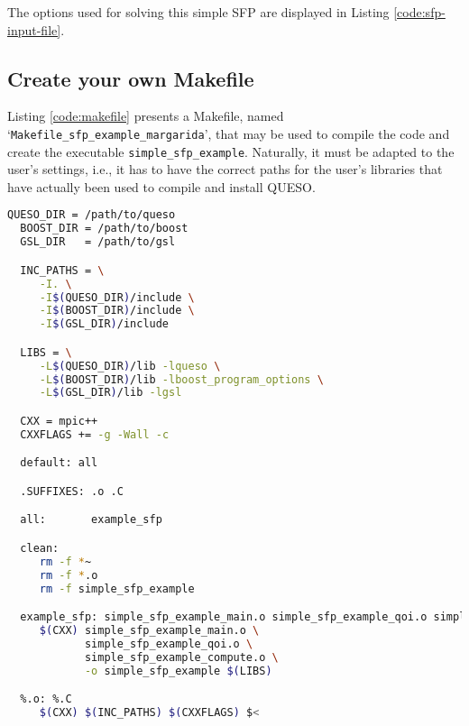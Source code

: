 The options used for solving this simple SFP are displayed in Listing \ref{code:sfp-input-file}.






\subsection{Create your own Makefile}\label{sec:sfp-makefile}

 
Listing \ref{code:makefile} presents a Makefile, named `\texttt{Makefile\_sfp\_example\_margarida}', that may be used to compile the code and create the executable \verb+simple_sfp_example+. Naturally, it must be adapted to the user's settings, i.e., it has to have the correct paths for the user's libraries that have actually been used to compile and install QUESO.

\begin{lstlisting}[caption={Makefile for the application code in Listings
  \ref{code:sfp-main-c}--\ref{code:sfp-compute-c}},
  label={code:sfp-makefile},
  language={bash}]
  QUESO_DIR = /path/to/queso
  BOOST_DIR = /path/to/boost
  GSL_DIR   = /path/to/gsl

  INC_PATHS = \
     -I. \
     -I$(QUESO_DIR)/include \
     -I$(BOOST_DIR)/include \
     -I$(GSL_DIR)/include

  LIBS = \
     -L$(QUESO_DIR)/lib -lqueso \
     -L$(BOOST_DIR)/lib -lboost_program_options \
     -L$(GSL_DIR)/lib -lgsl

  CXX = mpic++
  CXXFLAGS += -g -Wall -c

  default: all

  .SUFFIXES: .o .C

  all:       example_sfp

  clean:
     rm -f *~
     rm -f *.o
     rm -f simple_sfp_example

  example_sfp: simple_sfp_example_main.o simple_sfp_example_qoi.o simple_sfp_example_compute.o
     $(CXX) simple_sfp_example_main.o \
            simple_sfp_example_qoi.o \
            simple_sfp_example_compute.o \
            -o simple_sfp_example $(LIBS)

  %.o: %.C
     $(CXX) $(INC_PATHS) $(CXXFLAGS) $<
\end{lstlisting}

